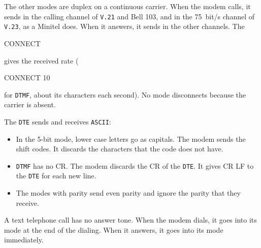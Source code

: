 \documentclass[a5paper,10pt]{article}
\DeclareRobustCommand{\rc}[1]{{\setlength{\fboxsep}{1pt}%
  \colorbox{dmrc}{\ttfamily\color{dmnavy}\rule[-0.45ex]{0pt}{1.95ex}#1}}}
\newcommand{\std}[1]{\texttt{#1}}
\begin{document}
The other modes are duplex on a continuous carrier.  When the modem
calls, it sends in the calling channel of \std{V.21} and Bell 103, and in
the 75~bit/s channel of \std{V.23}, as a Minitel does.  When it answers,
it sends in the other channels.  The \rc{CONNECT} gives the received rate
(\rc{CONNECT 10} for \std{DTMF}, about its characters each second).  No
mode disconnects because the carrier is absent.

The \std{DTE} sends and receives \std{ASCII}:
\begin{itemize}
\item In the 5-bit mode, lower case letters go as capitals.  The modem
  sends the shift codes.  It discards the characters that the code does
  not have.
\item \std{DTMF} has no CR.  The modem discards the CR of the \std{DTE}.
  It gives CR LF to the \std{DTE} for each new line.
\item The modes with parity send even parity and ignore the parity that
  they receive.
\end{itemize}
A text telephone call has no answer tone.  When the modem dials, it goes
into its mode at the end of the dialing.  When it answers, it goes into
its mode immediately.
\end{document}
